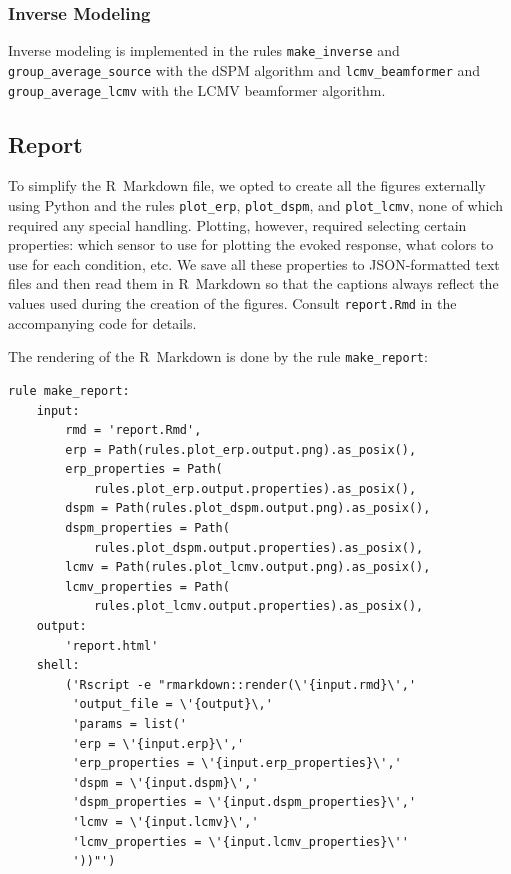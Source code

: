 \documentclass[a4paper,man,floatsintext,natbib]{apa6}
\begin{document}
\subsubsection{Inverse Modeling}
Inverse modeling is implemented in the rules \verb|make_inverse| and \verb|group_average_source| with the dSPM algorithm and \verb|lcmv_beamformer| and \verb|group_average_lcmv| with the LCMV beamformer algorithm.

\subsection{Report}
To simplify the R~Markdown file, we opted to create all the figures externally using Python and the rules \verb|plot_erp|, \verb|plot_dspm|, and \verb|plot_lcmv|, none of which required any special handling. Plotting, however, required selecting certain properties: which sensor to use for plotting the evoked response, what colors to use for each condition, etc. We save all these properties to JSON-formatted text files and then read them in R~Markdown so that the captions always reflect the values used during the creation of the figures. Consult \verb|report.Rmd| in the accompanying code for details.

The rendering of the R~Markdown is done by the rule \verb|make_report|:

\begin{verbatim}
rule make_report:
    input:
        rmd = 'report.Rmd',
        erp = Path(rules.plot_erp.output.png).as_posix(),
        erp_properties = Path(
            rules.plot_erp.output.properties).as_posix(),
        dspm = Path(rules.plot_dspm.output.png).as_posix(),
        dspm_properties = Path(
            rules.plot_dspm.output.properties).as_posix(),
        lcmv = Path(rules.plot_lcmv.output.png).as_posix(),
        lcmv_properties = Path(
            rules.plot_lcmv.output.properties).as_posix(),
    output:
        'report.html'
    shell:
        ('Rscript -e "rmarkdown::render(\'{input.rmd}\','
         'output_file = \'{output}\,'
         'params = list('
         'erp = \'{input.erp}\','
         'erp_properties = \'{input.erp_properties}\','
         'dspm = \'{input.dspm}\','
         'dspm_properties = \'{input.dspm_properties}\','
         'lcmv = \'{input.lcmv}\','
         'lcmv_properties = \'{input.lcmv_properties}\''
         '))"')
\end{verbatim}
\end{document}
